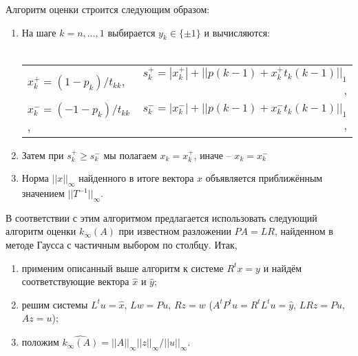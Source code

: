 Алгоритм оценки строится следующим образом:
\begin{enumerate}
	\item На шаге $ k = n, \dots, 1$ выбирается $y_k \in \{\pm1\}$ и вычисляются:\\\\
		\begin{tabular}{l r}
			$x^{+}_{k} = (1-p_k)/t_{kk}$, &	
			$s^{+}_{k} = |x^{+}_{k}| + || p(k-1) + x^{+}_{k}t_{k}(k-1) ||_1$, \\
			
			$x^{-}_{k} = (-1-p_k)/t_{kk}$, &	
			$s^{-}_{k} = |x^{-}_{k}| + || p(k-1) + x^{-}_{k}t_{k}(k-1) ||_1$, \\
		\end{tabular}
	\item Затем при $s^{+}_{k} \geq s^{-}_{k}$ мы полагаем $x_{k} = x_{k}^{+}$, иначе – $x_{k} = x^{-}_{k}$
	\item Норма $||x||_{ \infty }$ найденного в итоге вектора $x$ объявляется приближённым значением $||T^{-1}||_{ \infty }$.
\end{enumerate}

В соответствии с этим алгоритмом предлагается использовать следующий алгоритм оценки $k_{\infty}(A)$ при известном разложении $PA=LR$, найденном в методе Гаусса с частичным выбором по столбцу. Итак,
\begin{enumerate}
	\item применим описанный выше алгоритм к системе $R^{t}x=y$ и найдём соответствующие вектора $\hat{x}$ и $\hat{y}$;
	\item решим системы $L^{t}u=\hat{x}$, $Lw=Pu$, $Rz=w$ ($A^{t}P^{t}u=R^{t}L^{t}u = \hat{y}$, $LRz=Pu$, $Az=u$);
	\item положим $\hat{ k_{\infty} (A) } = ||A||_{\infty} ||z||_{\infty} / ||u||_{\infty}$.
\end{enumerate}



